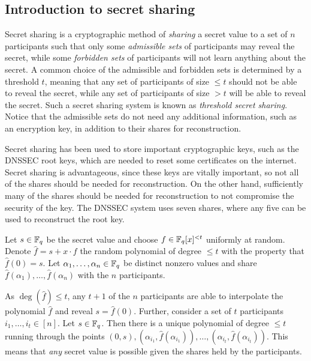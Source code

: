 \documentclass[../main.tex]{subfiles}
\begin{document}
\subsection{Introduction to secret sharing}

Secret sharing is a cryptographic method of \emph{sharing} a secret value to a set of $n$ participants such that only some \emph{admissible sets} of participants may reveal the secret, while some \emph{forbidden sets} of participants will not learn anything about the secret. A common choice of the admissible and forbidden sets is determined by a threshold $t$, meaning that any set of participants of size $\leq t$ should not be able to reveal the secret, while any set of participants of size $> t$ will be able to reveal the secret. Such a secret sharing system is known as \emph{threshold secret sharing}. Notice that the admissible sets do not need any additional information, such as an encryption key, in addition to their shares for reconstruction.

Secret sharing has been used to store important cryptographic keys, such as the DNSSEC root keys, which are needed to reset some certificates on the internet. Secret sharing is advantageous, since these keys are vitally important, so not all of the shares should be needed for reconstruction. On the other hand, sufficiently many of the shares should be needed for reconstruction to not compromise the security of the key. The DNSSEC system uses seven shares, where any five can be used to reconstruct the root key.

\begin{example}
Let $s \in \mathbb{F}_q$ be the secret value and choose $f \in \mathbb{F}_q[x]^{< t}$ uniformly at random. Denote $\hat{f} = s + x \cdot f$ the random polynomial of degree $\leq t$ with the property that $\hat{f}(0) = s$. Let $\alpha_1, \dots, \alpha_n \in \mathbb{F}_q$ be distinct nonzero values and share $\hat{f}(\alpha_1), \dots, \hat{f}(\alpha_n)$ with the $n$ participants.

As $\deg(\hat{f}) \leq t$, any $t + 1$ of the $n$ participants are able to interpolate the polynomial $\hat{f}$ and reveal $s = \hat{f}(0)$. Further, consider a set of $t$ participants $i_1, \dots, i_t \in [n]$. Let $s \in \mathbb{F}_q$. Then there is a unique polynomial of degree $\leq t$ running through the points $(0, s), (\alpha_{i_1}, \hat{f}(\alpha_{i_1})), \dots, (\alpha_{i_t}, \hat{f}(\alpha_{i_t}))$. This means that \emph{any} secret value is possible given the shares held by the participants.
\end{example}
\end{document}
